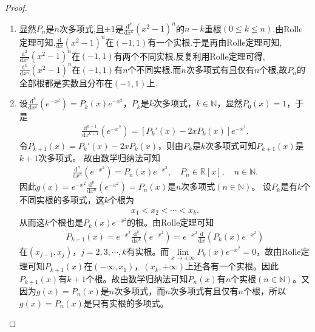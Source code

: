 \documentclass[../../main.tex]{subfiles}
\begin{document}
\begin{proof}
\begin{enumerate}
\item 显然$P_n$是$n$次多项式,且$\pm 1$是$\frac{\mathrm{d}^k}{\mathrm{d}x^k}(x^2-1)^n$的$n-k$重根$(0\leqslant k\leqslant n)$.由Rolle定理可知,$\frac{\mathrm{d}}{\mathrm{d}x}(x^2-1)^n$在$(-1,1)$有一个实根.于是再由Rolle定理可知,$\frac{\mathrm{d}^2}{\mathrm{d}x^2}(x^2-1)^n$在$(-1,1)$有两个不同实根.反复利用Rolle定理可得,$\frac{\mathrm{d}^n}{\mathrm{d}x^n}(x^2-1)^n$在$(-1,1)$有$n$个不同实根.而$n$次多项式有且仅有$n$个根,故$P_n$的全部根都是实数且分布在$(-1,1)$上.

\item 设$\frac{\mathrm{d}^k}{\mathrm{d}x^k}(e^{-x^2}) = P_k(x)e^{-x^2}$，$P_k$是$k$次多项式，$k\in \mathbb{N}$，显然$P_0(x) = 1$，于是
\begin{align*}
\frac{\mathrm{d}^{k+1}}{\mathrm{d}x^{k+1}}(e^{-x^2}) = \left[ P_k'(x) - 2xP_k(x) \right] e^{-x^2}.
\end{align*}
令$P_{k+1}(x) = P_k'(x) - 2xP_k(x)$，则由$P_k$是$k$次多项式可知$P_{k+1}(x)$是$k+1$次多项式。
故由数学归纳法可知
\begin{align*}
\frac{\mathrm{d}^n}{\mathrm{d}x^n}(e^{-x^2}) = P_n(x)e^{-x^2}, \quad P_n \in \mathbb{R}[x], \quad n \in \mathbb{N}.
\end{align*}
因此$g(x) = e^{-x^2}\frac{\mathrm{d}^n}{\mathrm{d}x^n}(e^{-x^2}) = P_n(x)$是$n$次多项式$(n \in \mathbb{N})$。
设$P_k$是有$k$个不同实根的多项式，这$k$个根为
\begin{align*}
x_1 < x_2 < \cdots < x_k.
\end{align*}
从而这$k$个根也是$P_k(x)e^{-x^2}$的根。由Rolle定理可知
\begin{align*}
P_{k+1}(x) = e^{-x^2}\frac{\mathrm{d}^k}{\mathrm{d}x^k}(e^{-x^2}) = e^{-x^2}\frac{\mathrm{d}}{\mathrm{d}x}\left( P_k(x)e^{-x^2} \right)
\end{align*}
在$(x_{j-1}, x_j)$，$j=2,3,\cdots,k$有实根。而$\lim\limits_{x \rightarrow \pm \infty} P_k(x)e^{-x^2} = 0$，故由Rolle定理可知$P_{k+1}(x)$在$(-\infty, x_1)$，$(x_k, +\infty)$上还各有一个实根。因此$P_{k+1}(x)$有$k+1$个根。故由数学归纳法可知$P_n(x)$有$n$个实根$(n \in \mathbb{N})$。又因为$g(x) = P_n(x)$是$n$次多项式，而$n$次多项式有且仅有$n$个根，所以$g(x) = P_n(x)$是只有实根的多项式。
\end{enumerate}

\end{proof}
\end{document}
